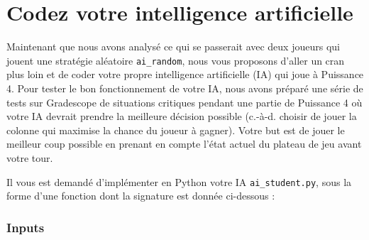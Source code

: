 \documentclass[11pt,answers]{exam}
\begin{document}
\newpage

\section{Codez votre intelligence artificielle}

Maintenant que nous avons analysé ce qui se passerait avec deux joueurs qui jouent une stratégie aléatoire \texttt{ai\_random}, nous vous proposons d’aller un cran plus loin et de coder votre propre intelligence artificielle (IA) qui joue à Puissance 4. Pour tester le bon fonctionnement de votre IA, nous avons préparé une série de tests sur Gradescope de situations critiques pendant une partie de Puissance 4 où votre IA devrait prendre la meilleure décision possible (c.-à-d. choisir de jouer la colonne qui maximise la chance du joueur à gagner). Votre but est de jouer le meilleur coup possible en prenant en compte l'état actuel du plateau de jeu avant votre tour.

\bigskip

Il vous est demandé d'implémenter en Python votre IA \texttt{ai\_student.py}, sous la forme d'une fonction dont la signature est donnée ci-dessous :





\subsubsection*{Inputs}
\end{document}
